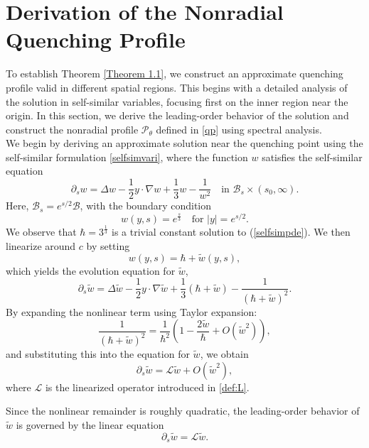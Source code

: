 \documentclass[11pt,reqno]{amsart}
\theoremstyle{definition}
\theoremstyle{bfremark}
\numberwithin{equation}{section}
\begin{document}
\section{Derivation of the Nonradial Quenching Profile}
\label{section2}

To establish Theorem \ref{Theorem 1.1}, we construct an approximate quenching profile valid in different spatial regions. This begins with a detailed analysis of the solution in self-similar variables, focusing first on the inner region near the origin. In this section, we derive the leading-order behavior of the solution and construct the nonradial profile \(\mathcal{P}_{\theta}\) defined in \ref{qp} using spectral analysis.\\

We begin by deriving an approximate solution near the quenching point using the self-similar formulation \ref{selfsimvari}, where the function \(w\) satisfies the self-similar equation
\begin{equation}
    \partial_s w = \Delta w - \frac{1}{2} y \cdot \nabla w + \frac{1}{3}w - \frac{1}{w^2} \quad \text{in } \mathcal{B}_s \times (s_0, \infty).\label{selfsimpde}
\end{equation}
Here, \(\mathcal{B}_s = e^{s/2} \mathcal{B}\), with the boundary condition
\[
    w(y,s) = e^{\frac{s}{3}} \quad \text{for } |y| = e^{s/2}.
\]
We observe that \(\hbar= 3^{\frac{1}{3}}\) is a trivial constant solution to (\ref{selfsimpde}). We then linearize around \(c\) by setting
\[
    w(y,s) = \hbar + \widetilde{w}(y,s),
\]
which yields the evolution equation for \(\widetilde{w}\),
\begin{equation}
    \partial_s \widetilde{w} = \Delta \widetilde{w} - \frac{1}{2} y \cdot \nabla \widetilde{w} + \frac{1}{3}(\hbar+\widetilde{w}) - \frac{1}{(\hbar + \widetilde{w})^2}.
\end{equation}
By expanding the nonlinear term using Taylor expansion:
\[
    \frac{1}{(\hbar+\widetilde{w})^2}=\frac{1}{\hbar^2}\left(1-\frac{2\widetilde{w}}{\hbar}+O(\widetilde{w}^2)\right),
\]
and substituting this into the equation for \(\widetilde{w}\), we obtain
\[
    \partial_s \widetilde{w} = \mathcal{L} \widetilde{w} + O(\widetilde{w}^2),
\]
where \(\mathcal{L}\) is the linearized operator introduced in \eqref{def:L}.

Since the nonlinear remainder is roughly quadratic, the leading-order behavior of \(\widetilde{w}\) is governed by the linear equation
\begin{equation}
    \partial_s \widetilde{w} = \mathcal{L} \widetilde{w}.\label{pdew}
\end{equation}
\end{document}

